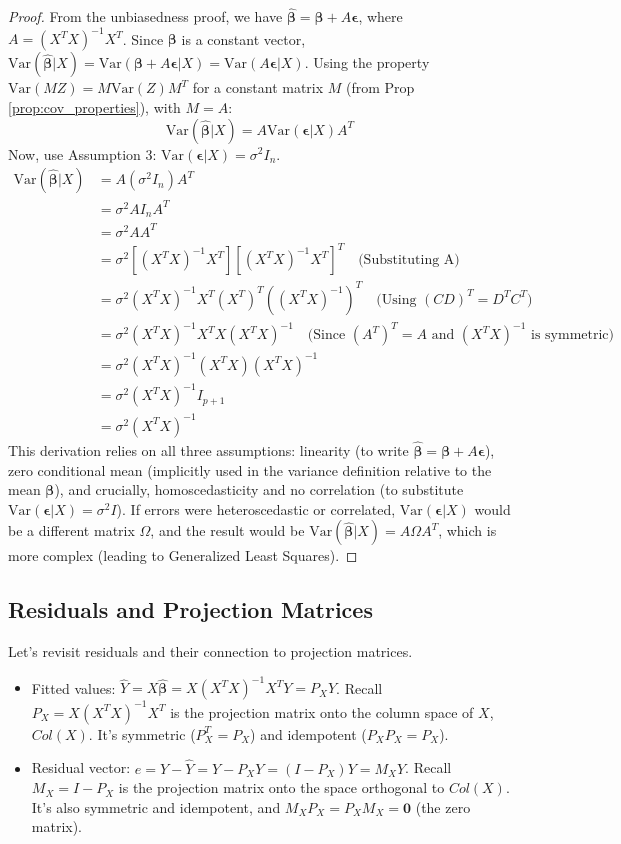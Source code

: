 \documentclass[11pt]{article}
\theoremstyle{definition}
\newcommand{\Var}{\mathrm{Var}} %
\newcommand{\T}{^T} %
\newcommand{\bbeta}{\bm{\beta}} %
\newcommand{\bepsilon}{\bm{\epsilon}} %
\newcommand{\bhat}[1]{\hat{\bm{#1}}} %
\begin{document}
\begin{proof}
From the unbiasedness proof, we have $\bhat{\beta} = \bbeta + A \bepsilon$, where $A = (X\T X)^{-1} X\T$.
Since $\bbeta$ is a constant vector, $\Var(\bhat{\beta} | X) = \Var(\bbeta + A \bepsilon | X) = \Var(A \bepsilon | X)$.
Using the property $\Var(MZ) = M \Var(Z) M\T$ for a constant matrix $M$ (from Prop \ref{prop:cov_properties}), with $M=A$:
\[ \Var(\bhat{\beta} | X) = A \Var(\bepsilon | X) A\T \]
Now, use Assumption 3: $\Var(\bepsilon | X) = \sigma^2 I_n$.
\begin{align*} \Var(\bhat{\beta} | X) &= A (\sigma^2 I_n) A\T \\ &= \sigma^2 A I_n A\T \\ &= \sigma^2 A A\T \\ &= \sigma^2 \left[ (X\T X)^{-1} X\T \right] \left[ (X\T X)^{-1} X\T \right]\T \quad \text{(Substituting A)} \\ &= \sigma^2 (X\T X)^{-1} X\T (X\T)\T ((X\T X)^{-1})\T \quad \text{(Using } (CD)\T = D\T C\T) \\ &= \sigma^2 (X\T X)^{-1} X\T X (X\T X)^{-1} \quad \text{(Since } (A\T)\T=A \text{ and } (X\T X)^{-1} \text{ is symmetric)} \\ &= \sigma^2 (X\T X)^{-1} (X\T X) (X\T X)^{-1} \\ &= \sigma^2 (X\T X)^{-1} I_{p+1} \\ &= \sigma^2 (X\T X)^{-1} \end{align*}
This derivation relies on all three assumptions: linearity (to write $\bhat{\beta} = \bbeta + A\bepsilon$), zero conditional mean (implicitly used in the variance definition relative to the mean $\bbeta$), and crucially, homoscedasticity and no correlation (to substitute $\Var(\bepsilon|X) = \sigma^2 I$). If errors were heteroscedastic or correlated, $\Var(\bepsilon|X)$ would be a different matrix $\Omega$, and the result would be $\Var(\bhat{\beta}|X) = A \Omega A\T$, which is more complex (leading to Generalized Least Squares).
\end{proof}

\subsection{Residuals and Projection Matrices}
\label{subsec:residuals_projections}

Let's revisit residuals and their connection to projection matrices.
\begin{itemize}
    \item Fitted values: $\hat{Y} = X\bhat{\beta} = X(X\T X)^{-1} X\T Y = P_X Y$. Recall $P_X = X(X\T X)^{-1} X\T$ is the projection matrix onto the column space of $X$, $Col(X)$. It's symmetric ($P_X\T = P_X$) and idempotent ($P_X P_X = P_X$).
    \item Residual vector: $e = Y - \hat{Y} = Y - P_X Y = (I - P_X)Y = M_X Y$. Recall $M_X = I - P_X$ is the projection matrix onto the space orthogonal to $Col(X)$. It's also symmetric and idempotent, and $M_X P_X = P_X M_X = \mathbf{0}$ (the zero matrix).
\end{itemize}
\end{document}
